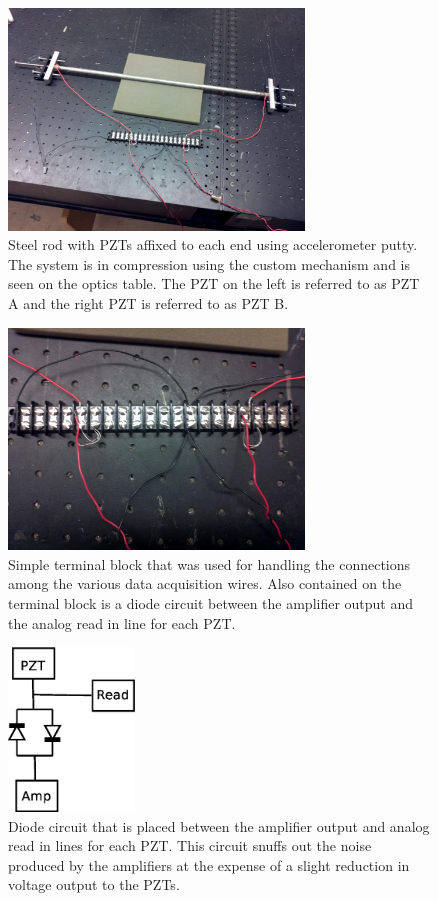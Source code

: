 \begin{figure}[ht!]
\centering
\includegraphics[width=0.7\textwidth]{eps_pics/steelUncrackedFull}
\caption{Steel rod with PZTs affixed to each end using accelerometer putty. The system is in compression using the custom mechanism and is seen on the optics table. The PZT on the left is referred to as PZT A and the right PZT is referred to as PZT B. 
 	 \label{fig:steelUncrackedFull}} 
\end{figure}

\begin{figure}[ht!]
\centering
\includegraphics[width=0.7\textwidth]{eps_pics/junctionBox}
\caption{Simple terminal block that was used for handling the connections among the various data acquisition wires. Also contained on the terminal block is a diode circuit between the amplifier output and the analog read in line for each PZT. 
 	 \label{fig:junctionBox}} 
\end{figure}

\begin{figure}[ht!]
\centering
\includegraphics[width=0.3\textwidth]{eps_pics/diodeCircuit}
\caption{Diode circuit that is placed between the amplifier output and analog read in lines for each PZT. This circuit snuffs out the noise produced by the amplifiers at the expense of a slight reduction in voltage output to the PZTs. 
 	 \label{fig:diodeCircuit}} 
\end{figure}

